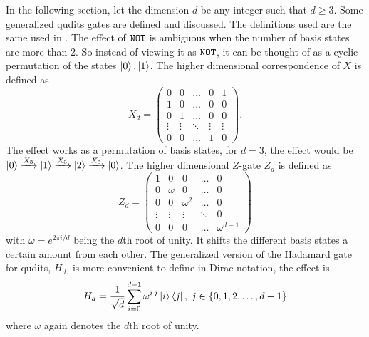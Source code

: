 In the following section, let the dimension $d$ be any integer such that $d \geq 3$. Some generalized qudits gates are defined and discussed. The definitions used are the same used in \cite{qudit}.
The effect of ${\tt NOT}$ is ambiguous when the number of basis states are more than 2. So instead of viewing it as ${\tt NOT}$, it can be thought of as a cyclic permutation of the states $\ket{0},\ket{1}$. The higher dimensional correspondence of $X$ is defined as
\begin{equation}
X_d = \begin{pmatrix}
0 & 0 & \dots & 0 & 1\\
1 & 0 & \dots & 0 & 0\\
0 & 1 & \dots & 0 & 0\\
\vdots & \vdots &\ddots& \vdots&\vdots\\
0 & 0& \dots & 1 & 0
\end{pmatrix}.
\end{equation}
The effect works as a permutation of basis states, for $d = 3$, the effect would be $\ket{0} \xrightarrow{X_3} \ket{1} \xrightarrow{X_3} \ket{2} \xrightarrow{X_3} \ket{0}$.
The higher dimensional $Z$-gate $Z_d$ is defined as 
\begin{equation}
Z_d = \begin{pmatrix}
1 & 0 & 0 & \dots & 0 \\
0 & \omega & 0 &\dots & 0\\
0 & 0 & \omega^2&\dots & 0 \\
\vdots & \vdots&\vdots&\ddots& 0\\
0 & 0& 0&\dots  & \omega^{d-1}
\end{pmatrix}
\end{equation}
with $\omega = e^{2\pi i/d}$ being the $d$th root of unity. It shifts the different basis states a certain amount from each other. The generalized version of the Hadamard gate for qudits, $H_d$, is more convenient to define in Dirac notation, the effect is 
\begin{equation}
H_d = \dfrac{1}{\sqrt{d}}\sum_{i=0}^{d-1} \omega^{i\,j}\ket{i}\bra{j},\; j\in \{0,1,2, \dots, d-1\}
\end{equation}
where $\omega$ again denotes the $d$th root of unity.

